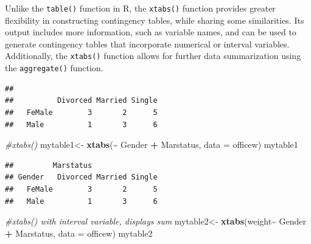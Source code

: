 \documentclass[
]{article}
\newenvironment{Shaded}{\begin{snugshade}}{\end{snugshade}}
\newcommand{\AttributeTok}[1]{\textcolor[rgb]{0.13,0.29,0.53}{#1}}
\newcommand{\CommentTok}[1]{\textcolor[rgb]{0.56,0.35,0.01}{\textit{#1}}}
\newcommand{\FunctionTok}[1]{\textcolor[rgb]{0.13,0.29,0.53}{\textbf{#1}}}
\newcommand{\NormalTok}[1]{#1}
\newcommand{\OtherTok}[1]{\textcolor[rgb]{0.56,0.35,0.01}{#1}}
\newcommand{\SpecialCharTok}[1]{\textcolor[rgb]{0.81,0.36,0.00}{\textbf{#1}}}
\begin{document}
Unlike the \texttt{table()} function in R, the \texttt{xtabs()} function
provides greater flexibility in constructing contingency tables, while
sharing some similarities. Its output includes more information, such as
variable names, and can be used to generate contingency tables that
incorporate numerical or interval variables. Additionally, the
\texttt{xtabs()} function allows for further data summarization using
the \texttt{aggregate()} function.

\begin{Shaded}
\end{Shaded}

\begin{verbatim}
##         
##          Divorced Married Single
##   FeMale        3       2      5
##   Male          1       3      6
\end{verbatim}

\begin{Shaded}
\begin{Highlighting}[]
\CommentTok{\#xtabs()}
\NormalTok{mytable1}\OtherTok{\textless{}{-}} \FunctionTok{xtabs}\NormalTok{(}\SpecialCharTok{\textasciitilde{}}\NormalTok{ Gender }\SpecialCharTok{+}\NormalTok{ Marstatus, }\AttributeTok{data =}\NormalTok{ officew)}
\NormalTok{mytable1}
\end{Highlighting}
\end{Shaded}

\begin{verbatim}
##         Marstatus
## Gender   Divorced Married Single
##   FeMale        3       2      5
##   Male          1       3      6
\end{verbatim}

\begin{Shaded}
\begin{Highlighting}[]
\CommentTok{\#xtabs() with interval variable, displays sum}
\NormalTok{mytable2}\OtherTok{\textless{}{-}} \FunctionTok{xtabs}\NormalTok{(weight}\SpecialCharTok{\textasciitilde{}}\NormalTok{ Gender }\SpecialCharTok{+}\NormalTok{ Marstatus, }\AttributeTok{data =}\NormalTok{ officew)}
\NormalTok{mytable2}
\end{Highlighting}
\end{Shaded}
\end{document}
